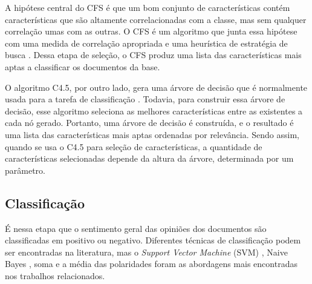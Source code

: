 \documentclass[template.tex]{subfiles}
\begin{document}

A hipótese central do CFS é que um bom conjunto de características contém características que são altamente correlacionadas com a classe, mas sem qualquer correlação umas com as outras. O CFS é um algoritmo que junta essa hipótese com uma medida de correlação apropriada e uma heurística de estratégia de busca \cite{hall1999correlation}. Dessa etapa de seleção, o CFS produz uma lista das características mais aptas a classificar os documentos da base. 

O algoritmo C4.5, por outro lado, gera uma árvore de decisão que é normalmente usada para a tarefa de classificação \cite{quinlan19934}. Todavia, para construir essa árvore de decisão, esse algoritmo seleciona as melhores características entre as existentes a cada nó gerado. Portanto, uma árvore de decisão é construída, e o resultado é uma lista das características mais aptas ordenadas por relevância. Sendo assim, quando se usa o C4.5 para seleção de características, a quantidade de características selecionadas depende da altura da árvore, determinada por um parâmetro.

\subsection{Classificação}

%
%
%
%
%

É nessa etapa que o sentimento geral das opiniões dos documentos são classificadas em positivo ou negativo. Diferentes técnicas de classificação podem ser encontradas na literatura, mas o \textit{Support Vector Machine} (SVM) \cite{pang2002thumbs, pang2004sentimental, tsutsumi2007movie, prabowo2009sentiment}, Naive Bayes \cite{pang2002thumbs, pang2004sentimental}, soma \cite{ohana2011domain, avancco2014lexicon} e a média \cite{turney2002thumbs, voll2007not, taboada2008extracting, taboada2011lexicon} das polaridades foram as abordagens mais encontradas nos trabalhos relacionados.
\end{document}
